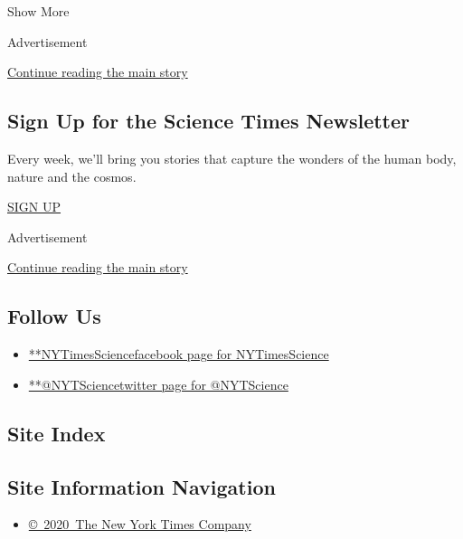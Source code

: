 Show More

Advertisement

\protect\hyperlink{after-mid2}{Continue reading the main story}

\hypertarget{sign-up-for-the-science-times-newsletter}{%
\subsection{Sign Up for the Science Times
Newsletter}\label{sign-up-for-the-science-times-newsletter}}

Every week, we'll bring you stories that capture the wonders of the
human body, nature and the cosmos.

\href{/newsletters/signup/SC}{SIGN UP}

Advertisement

\protect\hyperlink{after-mktg}{Continue reading the main story}

\hypertarget{follow-us}{%
\subsection{Follow Us}\label{follow-us}}

\begin{itemize}
\tightlist
\item
  \href{https://www.facebook.com/NYTimesScience}{**NYTimesSciencefacebook
  page for NYTimesScience}
\item
  \href{https://twitter.com/NYTScience}{**@NYTSciencetwitter page for
  @NYTScience}
\end{itemize}

\hypertarget{site-index}{%
\subsection{Site Index}\label{site-index}}

\hypertarget{site-information-navigation}{%
\subsection{Site Information
Navigation}\label{site-information-navigation}}

\begin{itemize}
\tightlist
\item
  \href{https://help.nytimes.com/hc/en-us/articles/115014792127-Copyright-notice}{©~2020~The
  New York Times Company}
\end{itemize}

